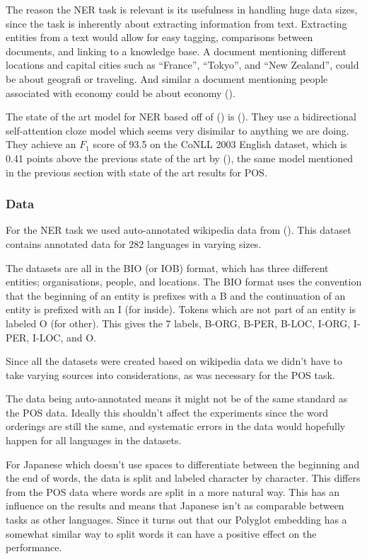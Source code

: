 The reason the NER task is relevant is its usefulness in handling huge data
sizes, since the task is inherently about extracting information from text.
Extracting entities from a text would allow for easy tagging, comparisons
between documents, and linking to a knowledge base. A document mentioning
different locations and capital cities such as ``France'', ``Tokyo'', and ``New
Zealand'', could be about geografi or traveling. And similar a document
mentioning people associated with economy could be about economy
(\cite{sang2003introduction}).

The state of the art model for NER based off of (\cite{ner-state}) is
(\cite{baevski2019cloze}). They use a bidirectional self-attention cloze model
which seems very disimilar to anything we are doing. They achieve an $F_{1}$ score of
93.5 on the CoNLL 2003 English dataset, which is 0.41 points above the previous
state of the art by (\cite{akbik2018coling}), the same model mentioned in the
previous section with state of the art results for POS.\

\subsubsection{Data}\label{sec:experiments-ner-data}

For the NER task we used auto-annotated wikipedia data from
(\cite{pan-etal-2017-cross}). This dataset contains annotated data for 282
languages in varying sizes. 

The datasets are all in the BIO (or IOB) format, which has three different
entities; organisations, people, and locations. The BIO format uses the
convention that the beginning of an entity is prefixes with a B and the
continuation of an entity is prefixed with an I (for inside). Tokens which are
not part of an entity is labeled O (for other). This gives the 7 labels, B-ORG,
B-PER, B-LOC, I-ORG, I-PER, I-LOC, and O. 

Since all the datasets were created based on wikipedia data we didn't have to
take varying sources into considerations, as was necessary for the POS task.

The data being auto-annotated means it might not be of the same standard as the
POS data. Ideally this shouldn't affect the experiments since the word orderings
are still the same, and systematic errors in the data would hopefully happen for
all languages in the datasets.

For Japanese which doesn't use spaces to differentiate between the beginning and
the end of words, the data is split and labeled character by character. This
differs from the POS data where words are split in a more natural way. This has
an influence on the results and means that Japanese isn't as comparable between
tasks as other languages. Since it turns out that our Polyglot embedding has a
somewhat similar way to split words it can have a positive effect on the
performance.

